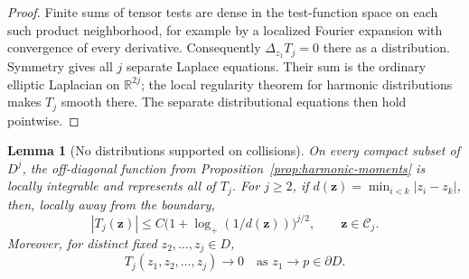 \documentclass[11pt]{article}
\newcommand{\R}{\mathbb R}
\newtheorem{lemma}[theorem]{Lemma}
\theoremstyle{definition}
\theoremstyle{remark}
\numberwithin{equation}{section}
\begin{document}
\begin{proof}
Finite sums of tensor tests are dense in the test-function space
on each such product neighborhood, for example by a localized
Fourier expansion with convergence of every derivative.
Consequently \(\Delta_{z_1}T_j=0\) there as a distribution.
Symmetry gives all \(j\) separate Laplace equations.  Their sum is
the ordinary elliptic Laplacian on \(\R^{2j}\); the local regularity
theorem for harmonic distributions makes \(T_j\) smooth there.
The separate distributional equations then hold pointwise.
\end{proof}

\begin{lemma}[No distributions supported on collisions]
\label{lem:no-diagonal}
On every compact subset of \(D^j\), the off-diagonal function from
Proposition~\ref{prop:harmonic-moments} is locally integrable and
represents all of \(T_j\).  For \(j\ge2\), if
\(d(\mathbf z)=\min_{i<k}|z_i-z_k|\), then, locally away from
the boundary,
\begin{equation}
 |T_j(\mathbf z)|
 \le C\bigl(1+\log_+(1/d(\mathbf z))\bigr)^{j/2},
 \qquad \mathbf z\in\mathcal C_j.
 \label{eq:limit-log-bound}
\end{equation}
Moreover, for distinct fixed \(z_2,\ldots,z_j\in D\),
\begin{equation}
 T_j(z_1,z_2,\ldots,z_j)\longrightarrow0
        \quad\text{as }z_1\longrightarrow p\in\partial D.
 \label{eq:limit-zero-boundary}
\end{equation}
\end{lemma}
\end{document}
